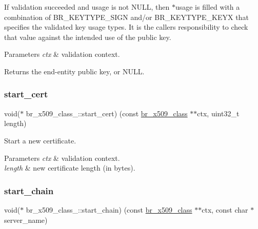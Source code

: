 If validation succeeded and {\ttfamily usage} is not {\ttfamily N\+U\+LL}, then {\ttfamily $\ast$usage} is filled with a combination of {\ttfamily B\+R\+\_\+\+K\+E\+Y\+T\+Y\+P\+E\+\_\+\+S\+I\+GN} and/or {\ttfamily B\+R\+\_\+\+K\+E\+Y\+T\+Y\+P\+E\+\_\+\+K\+E\+YX} that specifies the validated key usage types. It is the caller\textquotesingle{}s responsibility to check that value against the intended use of the public key.


\begin{DoxyParams}{Parameters}
{\em ctx} & validation context. \\
\hline
\end{DoxyParams}
\begin{DoxyReturn}{Returns}
the end-\/entity public key, or {\ttfamily N\+U\+LL}. 
\end{DoxyReturn}
\mbox{\label{structbr__x509__class___a7f09733a83c0badbb24128d26440ff55}} 
\subsubsection{\texorpdfstring{start\+\_\+cert}{start\_cert}}
{\footnotesize\ttfamily void($\ast$ br\+\_\+x509\+\_\+class\+\_\+\+::start\+\_\+cert) (const \hyperlink{bearssl__x509_8h_acf3af5c1ad4007b178e4c6d68ce5bb0d}{br\+\_\+x509\+\_\+class} $\ast$$\ast$ctx, uint32\+\_\+t length)}



Start a new certificate. 


\begin{DoxyParams}{Parameters}
{\em ctx} & validation context. \\
\hline
{\em length} & new certificate length (in bytes). \\
\hline
\end{DoxyParams}
\mbox{\label{structbr__x509__class___a61fcfd55c81fd2d32edeedd64714c7e2}} 
\subsubsection{\texorpdfstring{start\+\_\+chain}{start\_chain}}
{\footnotesize\ttfamily void($\ast$ br\+\_\+x509\+\_\+class\+\_\+\+::start\+\_\+chain) (const \hyperlink{bearssl__x509_8h_acf3af5c1ad4007b178e4c6d68ce5bb0d}{br\+\_\+x509\+\_\+class} $\ast$$\ast$ctx, const char $\ast$server\+\_\+name)}



